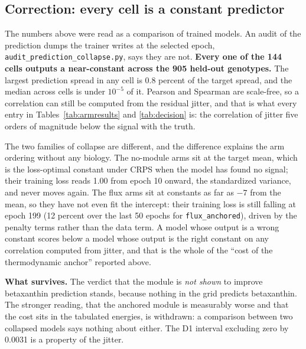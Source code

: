 \subsection{Correction: every cell is a constant predictor}
\label{sec:collapse}

The numbers above were read as a comparison of trained models. An audit of the prediction
dumps the trainer writes at the selected epoch, \texttt{audit\_prediction\_collapse.py},
says they are not. \textbf{Every one of the 144 cells outputs a near-constant across the
905 held-out genotypes.} The largest prediction spread in any cell is 0.8 percent of the
target spread, and the median across cells is under $10^{-5}$ of it. Pearson and Spearman
are scale-free, so a correlation can still be computed from the residual jitter, and that
is what every entry in Tables~\ref{tab:armresults} and \ref{tab:decision} is: the
correlation of jitter five orders of magnitude below the signal with the truth.



The two families of collapse are different, and the difference explains the arm ordering
without any biology. The no-module arms sit at the target mean, which is the loss-optimal
constant under CRPS when the model has found no signal; their training loss reads 1.00 from
epoch 10 onward, the standardized variance, and never moves again. The flux arms sit at
constants as far as $-7$ from the mean, so they have not even fit the intercept: their
training loss is still falling at epoch 199 (12 percent over the last 50 epochs for
\texttt{flux\_anchored}), driven by the penalty terms rather than the data term. A model
whose output is a wrong constant scores below a model whose output is the right constant
on any correlation computed from jitter, and that is the whole of the ``cost of the
thermodynamic anchor'' reported above.

\textbf{What survives.} The verdict that the module is \emph{not shown} to improve
betaxanthin prediction stands, because nothing in the grid predicts betaxanthin. The
stronger reading, that the anchored module is measurably worse and that the cost sits in
the tabulated energies, is withdrawn: a comparison between two collapsed models says
nothing about either. The D1 interval excluding zero by 0.0031 is a property of the jitter.

